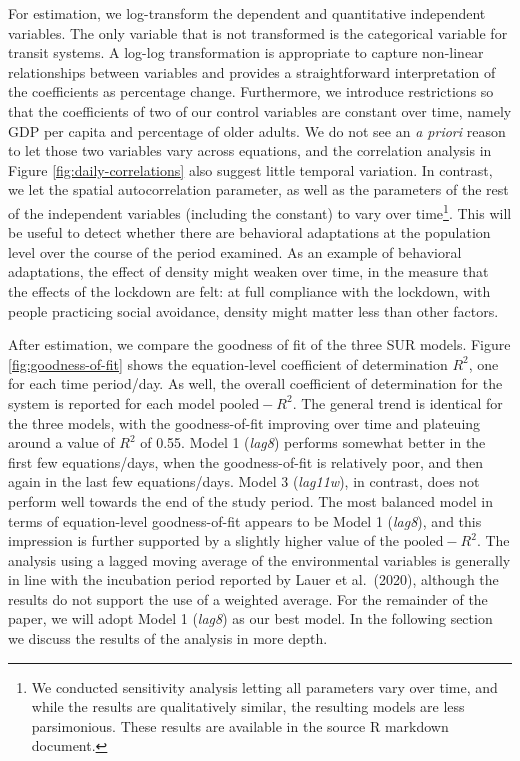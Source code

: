 \documentclass[]{elsarticle} %
\begin{document}
For estimation, we log-transform the dependent and quantitative
independent variables. The only variable that is not transformed is the
categorical variable for transit systems. A log-log transformation is
appropriate to capture non-linear relationships between variables and
provides a straightforward interpretation of the coefficients as
percentage change. Furthermore, we introduce restrictions so that the
coefficients of two of our control variables are constant over time,
namely GDP per capita and percentage of older adults. We do not see an
\emph{a priori} reason to let those two variables vary across equations,
and the correlation analysis in Figure \ref{fig:daily-correlations} also
suggest little temporal variation. In contrast, we let the spatial
autocorrelation parameter, as well as the parameters of the rest of the
independent variables (including the constant) to vary over
time\footnote{We conducted sensitivity analysis letting all parameters vary over time, and while the results are qualitatively similar, the resulting models are less parsimonious. These results are available in the source R markdown document.}.
This will be useful to detect whether there are behavioral adaptations
at the population level over the course of the period examined. As an
example of behavioral adaptations, the effect of density might weaken
over time, in the measure that the effects of the lockdown are felt: at
full compliance with the lockdown, with people practicing social
avoidance, density might matter less than other factors.

After estimation, we compare the goodness of fit of the three SUR
models. Figure \ref{fig:goodness-of-fit} shows the equation-level
coefficient of determination \(R^2\), one for each time period/day. As
well, the overall coefficient of determination for the system is
reported for each model \(\text{pooled}-R^2\). The general trend is
identical for the three models, with the goodness-of-fit improving over
time and plateuing around a value of \(R^2\) of 0.55. Model 1
(\emph{lag8}) performs somewhat better in the first few equations/days,
when the goodness-of-fit is relatively poor, and then again in the last
few equations/days. Model 3 (\emph{lag11w}), in contrast, does not
perform well towards the end of the study period. The most balanced
model in terms of equation-level goodness-of-fit appears to be Model 1
(\emph{lag8}), and this impression is further supported by a slightly
higher value of the \(\text{pooled}-R^2\). The analysis using a lagged
moving average of the environmental variables is generally in line with
the incubation period reported by Lauer et al.~(2020), although the
results do not support the use of a weighted average. For the remainder
of the paper, we will adopt Model 1 (\emph{lag8}) as our best model. In
the following section we discuss the results of the analysis in more
depth.
\end{document}
